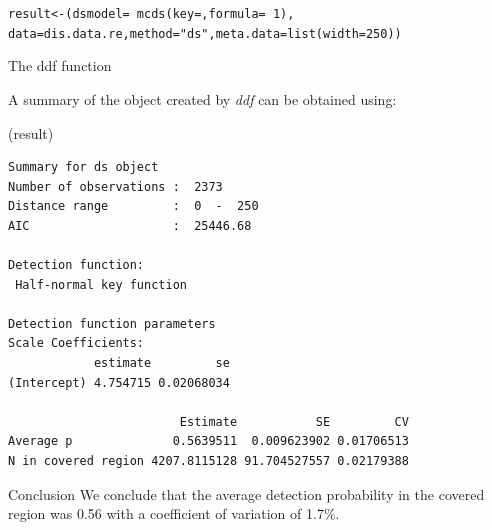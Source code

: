 \begin{knitrout}\footnotesize
{}\color{fgcolor}
\begin{kframe}
\begin{alltt}
result <- (dsmodel=~mcds(key=, formula=~1), 
     data = dis.data.re, method="ds", meta.data=list(width=250))
\end{alltt}
\end{kframe}
\end{knitrout}
\begin{block}{The ddf function}

A summary of the object created by \textit{ddf} can be obtained using: 

\end{block}
\begin{knitrout}\scriptsize
{}\color{fgcolor}
\begin{kframe}
\noindent
{}(result)
\begin{verbatim}
Summary for ds object 
Number of observations :  2373 
Distance range         :  0  -  250 
AIC                    :  25446.68 

Detection function:
 Half-normal key function 

Detection function parameters 
Scale Coefficients:  
            estimate         se
(Intercept) 4.754715 0.02068034

                        Estimate           SE         CV
Average p              0.5639511  0.009623902 0.01706513
N in covered region 4207.8115128 91.704527557 0.02179388
\end{verbatim}
\end{kframe}
\end{knitrout}
\begin{block}{Conclusion}
We conclude that the average detection probability in the covered region was 0.56 with a coefficient of variation of 1.7\%. 
\end{block}

